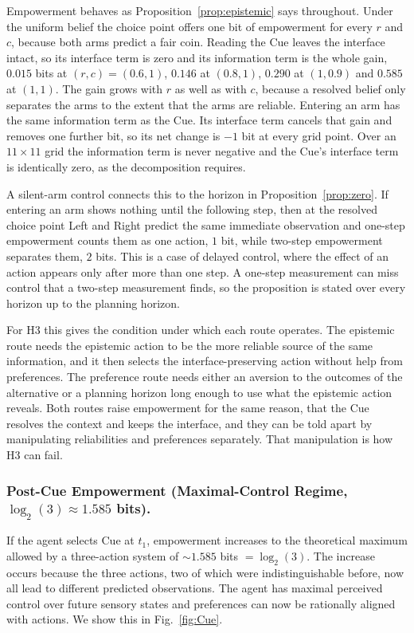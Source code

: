\documentclass[letterpaper]{article} %
\theoremstyle{definition}
\begin{document}
Empowerment behaves as Proposition~\ref{prop:epistemic} says throughout. Under the uniform belief the choice point offers one bit of empowerment for every $r$ and $c$, because both arms predict a fair coin. Reading the Cue leaves the interface intact, so its interface term is zero and its information term is the whole gain, $0.015$ bits at $(r, c) = (0.6, 1)$, $0.146$ at $(0.8, 1)$, $0.290$ at $(1, 0.9)$ and $0.585$ at $(1, 1)$. The gain grows with $r$ as well as with $c$, because a resolved belief only separates the arms to the extent that the arms are reliable. Entering an arm has the same information term as the Cue. Its interface term cancels that gain and removes one further bit, so its net change is $-1$ bit at every grid point. Over an $11 \times 11$ grid the information term is never negative and the Cue's interface term is identically zero, as the decomposition requires.

A silent-arm control connects this to the horizon in Proposition~\ref{prop:zero}. If entering an arm shows nothing until the following step, then at the resolved choice point Left and Right predict the same immediate observation and one-step empowerment counts them as one action, $1$ bit, while two-step empowerment separates them, $2$ bits. This is a case of delayed control, where the effect of an action appears only after more than one step. A one-step measurement can miss control that a two-step measurement finds, so the proposition is stated over every horizon up to the planning horizon.

For H3 this gives the condition under which each route operates. The epistemic route needs the epistemic action to be the more reliable source of the same information, and it then selects the interface-preserving action without help from preferences. The preference route needs either an aversion to the outcomes of the alternative or a planning horizon long enough to use what the epistemic action reveals. Both routes raise empowerment for the same reason, that the Cue resolves the context and keeps the interface, and they can be told apart by manipulating reliabilities and preferences separately. That manipulation is how H3 can fail.

\subsubsection{Post-Cue Empowerment (Maximal-Control Regime, $\log_2(3)\approx 1.585$ bits).}

If the agent selects Cue at $t_1$, empowerment increases to the theoretical maximum allowed by a three-action system of ${\sim}1.585$ bits $= \log_2(3)$. The increase occurs because the three actions, two of which were indistinguishable before, now all lead to different predicted observations. The agent has maximal perceived control over future sensory states and preferences can now be rationally aligned with actions. We show this in Fig.~\ref{fig:Cue}.
\end{document}
